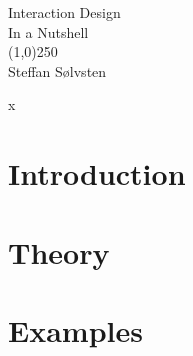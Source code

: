 \documentclass[a4, english, twoside]{article}
\begin{document}

\thispagestyle{empty} %
\begin{center}
	\phantom{}\vspace{3.1cm}
	{\Huge\sc Interaction Design}
	\\ \vspace{1em}
	{\LARGE\sc In a Nutshell}
	\\
	\line(1,0){250}
	\\ \vspace{1em}
	{\LARGE Steffan Sølvsten}
\end{center}

\BgThispage

\newpage
x

\newpage
\thispagestyle{empty} %
\tableofcontents

\newpage
\section{Introduction}
\label{sec:introduction}



\newpage
\setcounter{page}{1}

\section{Theory}
\label{sec:1}













\newpage
\section{Examples}
\label{sec:2}
\end{document}
